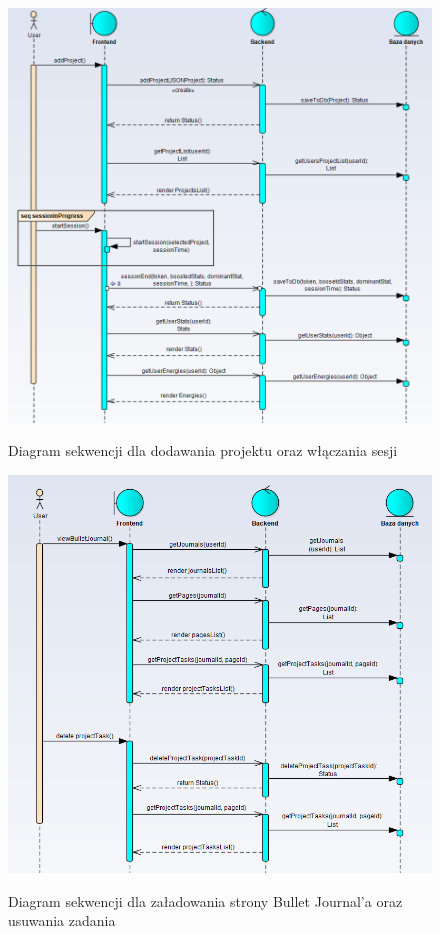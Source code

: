 \documentclass[a4paper,11pt]{report}
\begin{document}
\begin{figure}[H]
	\centering
	\includegraphics[scale=0.6]{sekwencji}\\
	\caption{Diagram sekwencji dla dodawania projektu oraz włączania sesji}
	\label{fig:seq1}
\end{figure}
\begin{figure}[H]
	\centering
	\includegraphics[scale=0.6]{sekwencji1}\\
	\caption{Diagram sekwencji dla załadowania strony Bullet Journal’a oraz usuwania zadania}
	\label{fig:seq2}
\end{figure}
\end{document}
